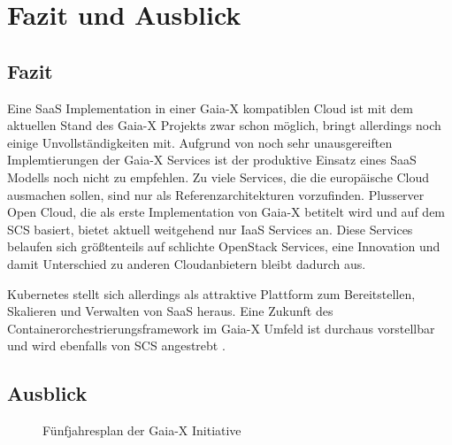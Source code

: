 \chapter{Fazit und Ausblick}
\label{chapter:fazit}

\section{Fazit}
\label{sec:fazit_ausblick:fazit}

Eine \ac{SaaS} Implementation in einer Gaia-X kompatiblen Cloud ist mit dem aktuellen Stand des Gaia-X Projekts zwar schon 
möglich, bringt allerdings noch einige Unvollständigkeiten mit.
Aufgrund von noch sehr unausgereiften Implemtierungen der Gaia-X Services ist der produktive Einsatz eines \ac{SaaS}
Modells noch nicht zu empfehlen. 
Zu viele Services, die die europäische Cloud ausmachen sollen, sind nur als Referenzarchitekturen vorzufinden.
Plusserver Open Cloud, die als erste Implementation von Gaia-X betitelt wird und auf dem \acf{SCS} basiert, 
bietet aktuell weitgehend nur \ac{IaaS} Services an.
Diese Services belaufen sich größtenteils auf schlichte OpenStack Services, 
eine Innovation und damit Unterschied zu anderen Cloudanbietern bleibt dadurch aus.

Kubernetes stellt sich allerdings als attraktive Plattform zum Bereitstellen, Skalieren und Verwalten von \acf{SaaS} heraus.
Eine Zukunft des Containerorchestrierungsframework im Gaia-X Umfeld ist durchaus vorstellbar und wird ebenfalls von \ac{SCS}
angestrebt \cite{scs}.

\newpage
\section{Ausblick}
\label{sec:fazit_ausblick:fazit}

\begin{figure}[h]
  \centering
  \caption{Fünfjahresplan der Gaia-X Initiative}
  \label{fig:gaia-x-ausblick}
\end{figure}

